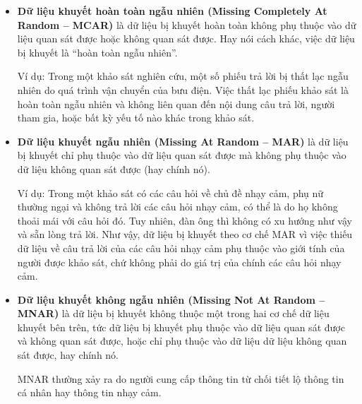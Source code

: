 \begin{itemize}
    \item \textbf{Dữ liệu khuyết hoàn toàn ngẫu nhiên (Missing Completely At Random -- MCAR)} là dữ liệu bị khuyết hoàn toàn không phụ thuộc vào dữ liệu quan sát được hoặc không quan sát được. Hay nói cách khác, việc dữ liệu bị khuyết là ``hoàn toàn ngẫu nhiên''.

    
    Ví dụ: Trong một khảo sát nghiên cứu, một số phiếu trả lời bị thất lạc ngẫu nhiên do quá trình vận chuyển của bưu điện. Việc thất lạc phiếu khảo sát là hoàn toàn ngẫu nhiên và không liên quan đến nội dung câu trả lời, người tham gia, hoặc bất kỳ yếu tố nào khác trong khảo sát.


    \item \textbf{Dữ liệu khuyết ngẫu nhiên (Missing At Random -- MAR)} là dữ liệu bị khuyết chỉ phụ thuộc vào dữ liệu quan sát được mà không phụ thuộc vào dữ liệu không quan sát được (hay chính nó).

    Ví dụ: Trong một khảo sát có các câu hỏi về chủ đề nhạy cảm, phụ nữ thường ngại và không trả lời các câu hỏi nhạy cảm, có thể là do họ không thoải mái với câu hỏi đó. Tuy nhiên, đàn ông thì không có xu hướng như vậy và sẵn lòng trả lời. Như vậy, dữ liệu bị khuyết theo cơ chế MAR vì việc thiếu dữ liệu về câu trả lời của các câu hỏi nhạy cảm phụ thuộc vào giới tính của người được khảo sát, chứ không phải do giá trị của chính các câu hỏi nhạy cảm.


    \item \textbf{Dữ liệu khuyết không ngẫu nhiên (Missing Not At Random -- MNAR)} là dữ liệu bị khuyết không thuộc một trong hai cơ chế dữ liệu khuyết bên trên, tức dữ liệu bị khuyết phụ thuộc vào dữ liệu quan sát được và không quan sát được, hoặc chỉ phụ thuộc vào dữ liệu dữ liệu không quan sát được, hay chính nó.

    MNAR thường xảy ra do người cung cấp thông tin từ chối tiết lộ thông tin cá nhân hay thông tin nhạy cảm.



\end{itemize}
